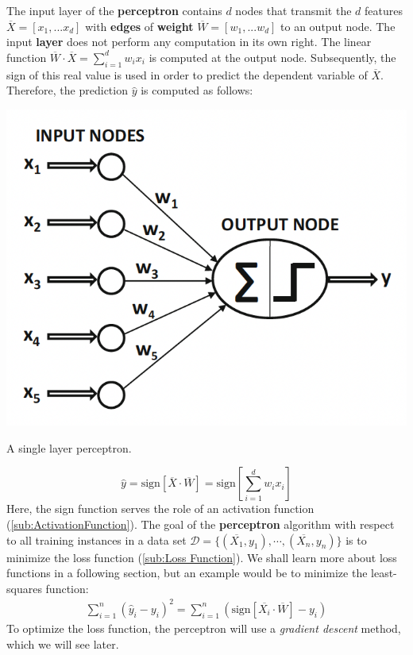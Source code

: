 \documentclass[nobib]{tufte-handout} %
\begin{document}
The input layer of the \textbf{perceptron} contains $d$ nodes that transmit the $d$ features $\overline{X} = [x_1, . . . x_d]$ with \textbf{edges} of \textbf{weight} $\overline{W} = [w_1, . . . w_d]$  to an output node. The input \textbf{layer} does not perform any computation in its own right. The linear function $\overline{W} \cdot \overline{X} =\sum^{d}_{i=1}  w_ix_i$ is computed at the output node. Subsequently, the sign of this real value is used in order to predict the dependent variable of $\overline{X}$. Therefore, the prediction $\hat y$ is computed as follows:
\begin{marginfigure}
  \includegraphics{SingleLayerP}
  \label{SingleLayerP}
  \caption{A single layer perceptron.}
\end{marginfigure}
  \label{sub:Single Layer Perceptron}
 $$\hat y = \text{sign}[\overline{X} \cdot \overline{W}] =\text{sign}\left[\sum^{d}_{i=1}  w_ix_i\right] $$ 
 Here, the sign function serves the role of an activation function (\ref{sub:ActivationFunction}). The goal of the \textbf{perceptron} algorithm with respect to all training instances in a data set $\mathcal{D} = \{(\overline{X_1}, y_1 ), \cdots,(\overline{X_n}, y_n )\}$ is to minimize the loss function (\ref{sub:Loss Function}). We shall learn more about loss functions in a following section, but an example would be to minimize the least-squares function: 
 \begin{equation*}
  \begin{split}
    \sum^{n}_{i=1} (\hat y_i - y_i)^2 =\sum^{n}_{i=1} \left(\text{sign}[\overline{X_i} \cdot \overline{W}] -y_i \right)
  \end{split}
 \end{equation*}
 To optimize the loss function, the perceptron will use a \textit{gradient descent} method, which we will see later.
\end{document}
